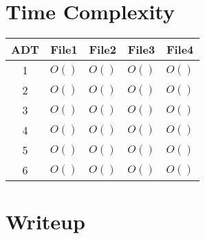 \documentclass[12pt]{article}
\begin{document}
\section{Time Complexity}

\begin{center}
    \begin{tabular}{c c c c c}
        ADT & File1 & File2 & File3 & File4 \\
        \hline
        1   & $O()$ & $O()$ & $O()$ & $O()$ \\
        2   & $O()$ & $O()$ & $O()$ & $O()$ \\
        3   & $O()$ & $O()$ & $O()$ & $O()$ \\
        4   & $O()$ & $O()$ & $O()$ & $O()$ \\
        5   & $O()$ & $O()$ & $O()$ & $O()$ \\
        6   & $O()$ & $O()$ & $O()$ & $O()$
    \end{tabular}
\end{center}

\section{Writeup}

\begin{doublespace}
    \lipsum[1-7]
\end{doublespace}
\end{document}
